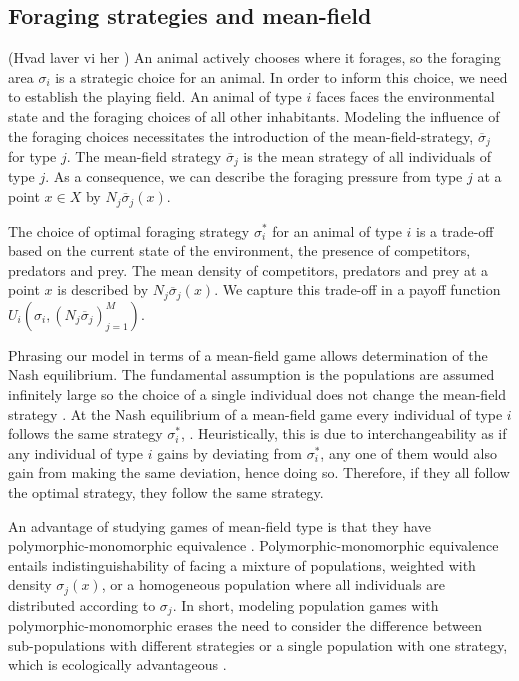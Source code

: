 \subsection{Foraging strategies and mean-field}(Hvad laver vi her )
An animal actively chooses where it forages, so the foraging area $\sigma_i$ is a strategic choice for an animal. In order to inform this choice, we need to establish the playing field. An animal of type $i$ faces faces the environmental state and the foraging choices of all other inhabitants. Modeling the influence of the foraging choices necessitates the introduction of the mean-field-strategy, $\overbar{\sigma}_j$ for type $j$. The mean-field strategy $\overbar{\sigma}_j$ is the mean strategy of all individuals of type $j$. As a consequence, we can describe the foraging pressure from type $j$ at a point $x\in X$ by $N_j \overbar{\sigma}_j(x)$.


The choice of optimal foraging strategy $\sigma_i^*$ for an animal of type $i$ is a trade-off based on the current state of the environment, the presence of competitors, predators and prey. The mean density of competitors, predators and prey at a point $x$ is described by $N_j \overbar{\sigma}_j(x)$. We capture this trade-off in a payoff function $U_i(\sigma_i, (N_j \overbar{\sigma}_j)_{j=1}^M)$.


Phrasing our model in terms of a mean-field game allows determination of the Nash equilibrium. The fundamental assumption is the populations are assumed infinitely large so the choice of a single individual does not change the mean-field strategy \citep{aumann1964markets}. At the Nash equilibrium of a mean-field game every individual of type $i$ follows the same strategy $\sigma_i^*$, \citep{lasry2007mean}. Heuristically, this is due to interchangeability as if any individual of type $i$ gains by deviating from $\sigma_i^*$, any one of them would also gain from making the same deviation, hence doing so. Therefore, if they all follow the optimal strategy, they follow the same strategy.



An advantage of studying games of mean-field type is that they have polymorphic-monomorphic equivalence \citep{broom2014asymmetric}. Polymorphic-monomorphic equivalence entails indistinguishability of facing a mixture of populations, weighted with density $\sigma_j(x)$, or a homogeneous population where all individuals are distributed according to $\sigma_j$. In short, modeling population games with polymorphic-monomorphic erases the need to consider the difference between sub-populations with different strategies or a single population with one strategy, which is ecologically advantageous \citep{broom2013game}.


